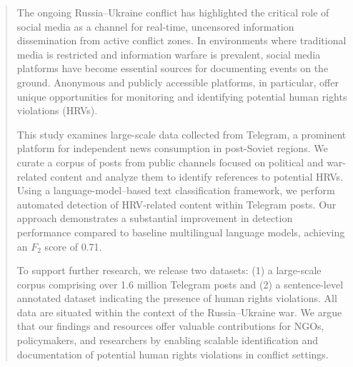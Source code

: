 \begin{abstract}
The ongoing Russia--Ukraine conflict has highlighted the critical role of social media as a channel for real-time, uncensored information dissemination from active conflict zones. In environments where traditional media is restricted and information warfare is prevalent, social media platforms have become essential sources for documenting events on the ground. Anonymous and publicly accessible platforms, in particular, offer unique opportunities for monitoring and identifying potential human rights violations (HRVs).

This study examines large-scale data collected from Telegram, a prominent platform for independent news consumption in post-Soviet regions. We curate a corpus of posts from public channels focused on political and war-related content and analyze them to identify references to potential HRVs. Using a language-model--based text classification framework, we perform automated detection of HRV-related content within Telegram posts. Our approach demonstrates a substantial improvement in detection performance compared to baseline multilingual language models, achieving an $F_2$ score of 0.71.

To support further research, we release two datasets: (1) a large-scale corpus comprising over 1.6 million Telegram posts and (2) a sentence-level annotated dataset indicating the presence of human rights violations. All data are situated within the context of the Russia--Ukraine war. We argue that our findings and resources offer valuable contributions for NGOs, policymakers, and researchers by enabling scalable identification and documentation of potential human rights violations in conflict settings.
\end{abstract}
